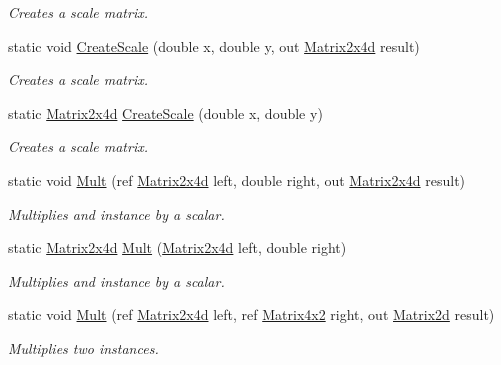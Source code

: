 \begin{DoxyCompactItemize}
\begin{DoxyCompactList}\small\item\em Creates a scale matrix. \end{DoxyCompactList}\item 
static void \hyperlink{struct_open_t_k_1_1_matrix2x4d_a18cfdc7f8440b7db1a6dfd27df21505b}{Create\-Scale} (double x, double y, out \hyperlink{struct_open_t_k_1_1_matrix2x4d}{Matrix2x4d} result)
\begin{DoxyCompactList}\small\item\em Creates a scale matrix. \end{DoxyCompactList}\item 
static \hyperlink{struct_open_t_k_1_1_matrix2x4d}{Matrix2x4d} \hyperlink{struct_open_t_k_1_1_matrix2x4d_a20a7b3128906f8c73308f6d3cc32cfd3}{Create\-Scale} (double x, double y)
\begin{DoxyCompactList}\small\item\em Creates a scale matrix. \end{DoxyCompactList}\item 
static void \hyperlink{struct_open_t_k_1_1_matrix2x4d_a698e7c8241b1d29880130940b17b6161}{Mult} (ref \hyperlink{struct_open_t_k_1_1_matrix2x4d}{Matrix2x4d} left, double right, out \hyperlink{struct_open_t_k_1_1_matrix2x4d}{Matrix2x4d} result)
\begin{DoxyCompactList}\small\item\em Multiplies and instance by a scalar. \end{DoxyCompactList}\item 
static \hyperlink{struct_open_t_k_1_1_matrix2x4d}{Matrix2x4d} \hyperlink{struct_open_t_k_1_1_matrix2x4d_a7409eaa2c15c01615661022c0d00c584}{Mult} (\hyperlink{struct_open_t_k_1_1_matrix2x4d}{Matrix2x4d} left, double right)
\begin{DoxyCompactList}\small\item\em Multiplies and instance by a scalar. \end{DoxyCompactList}\item 
static void \hyperlink{struct_open_t_k_1_1_matrix2x4d_adf7d26e116ba2865c183eaa747f5d86c}{Mult} (ref \hyperlink{struct_open_t_k_1_1_matrix2x4d}{Matrix2x4d} left, ref \hyperlink{struct_open_t_k_1_1_matrix4x2}{Matrix4x2} right, out \hyperlink{struct_open_t_k_1_1_matrix2d}{Matrix2d} result)
\begin{DoxyCompactList}\small\item\em Multiplies two instances. \end{DoxyCompactList}\item 

\end{DoxyCompactItemize}
